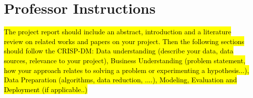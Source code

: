 \documentclass[sigconf, nonacm]{acmart}
\newcommand\vldbdoi{XX.XX/XXX.XX}
\newcommand\vldbpages{XXX-XXX}
\newcommand\vldbvolume{14}
\newcommand\vldbissue{1}
\newcommand\vldbyear{2020}
\newcommand\vldbauthors{\authors}
\newcommand\vldbtitle{\shorttitle}
\newcommand\vldbavailabilityurl{URL_TO_YOUR_ARTIFACTS}
\newcommand\vldbpagestyle{plain}
\begin{document}
\maketitle





\section{Professor Instructions}
\hl{
The project report should include an abstract, introduction and a literature review on related works and papers on your project. Then the following sections should follow the CRISP-DM: Data understanding (describe your data, data sources, relevance to your project), Business Understanding (problem statement, how your approach relates to solving a problem or experimenting a hypothesis...), Data Preparation (algorithms, data reduction, ....), Modeling, Evaluation and Deployment (if applicable..) }
\end{document}
